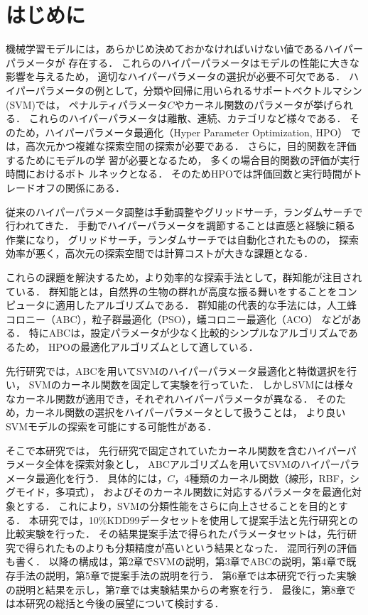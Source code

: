 \section{はじめに}
機械学習モデルには，あらかじめ決めておかなければいけない値であるハイパーパラメータが
存在する．
これらのハイパーパラメータはモデルの性能に大きな影響を与えるため，
適切なハイパーパラメータの選択が必要不可欠である\cite{essential}．
ハイパーパラメータの例として，分類や回帰に用いられるサポートベクトルマシン(SVM)では，
ペナルティパラメータ$C$やカーネル関数のパラメータが挙げられる．
これらのハイパーパラメータは離散、連続、カテゴリなど様々である．
そのため，ハイパーパラメータ最適化（Hyper Parameter Optimization, HPO）
では，高次元かつ複雑な探索空間の探索が必要である．
さらに，目的関数を評価するためにモデルの学
習が必要となるため，
多くの場合目的関数の評価が実行時間におけるボト
ルネックとなる．
そのためHPOでは評価回数と実行時間がトレードオフの関係にある\cite{trade}．

従来のハイパーパラメータ調整は手動調整やグリッドサーチ，ランダムサーチで行われてきた．
手動でハイパーパラメータを調節することは直感と経験に頼る作業になり，
グリッドサーチ，ランダムサーチでは自動化されたものの，
探索効率が悪く，高次元の探索空間では計算コストが大きな課題となる．

これらの課題を解決するため，より効率的な探索手法として，群知能が注目されている．
群知能とは，自然界の生物の群れが高度な振る舞いをすることをコンピュータに適用したアルゴリズムである\cite{population}．
群知能の代表的な手法には，人工蜂コロニー（ABC），粒子群最適化（PSO），蟻コロニー最適化（ACO）
などがある．
特にABCは，設定パラメータが少なく比較的シンプルなアルゴリズムであるため，
HPOの最適化アルゴリズムとして適している．

先行研究では，ABCを用いてSVMのハイパーパラメータ最適化と特徴選択を行い，
SVMのカーネル関数を固定して実験を行っていた\cite{origin}．
しかしSVMには様々なカーネル関数が適用でき，それぞれハイパーパラメータが異なる．
そのため，カーネル関数の選択をハイパーパラメータとして扱うことは，
より良いSVMモデルの探索を可能にする可能性がある．

そこで本研究では，
先行研究で固定されていたカーネル関数を含むハイパーパラメータ全体を探索対象とし，
ABCアルゴリズムを用いてSVMのハイパーパラメータ最適化を行う．
具体的には，$C$，4種類のカーネル関数（線形，RBF，シグモイド，多項式），
およびそのカーネル関数に対応するパラメータを最適化対象とする．
これにより，SVMの分類性能をさらに向上させることを目的とする．
 本研究では，10\%KDD99データセットを使用して提案手法と先行研究との比較実験を行った．
その結果提案手法で得られたパラメータセットは，先行研究で得られたものよりも分類精度が高いという結果となった．
混同行列の評価も書く．
以降の構成は，第2章でSVMの説明，第3章でABCの説明，第4章で既存手法の説明，第5章で提案手法の説明を行う．
第6章では本研究で行った実験の説明と結果を示し，第7章では実験結果からの考察を行う．
最後に，第8章では本研究の総括と今後の展望について検討する．
